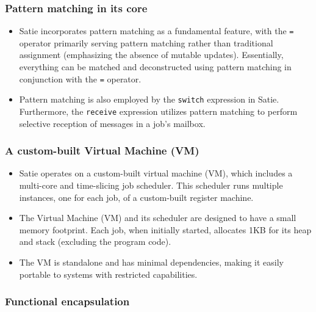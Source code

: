 \hypertarget{pattern-matching-in-its-core}{%
\subsubsection{Pattern matching in its
core}\label{pattern-matching-in-its-core}}

\begin{itemize}
\item
  Satie incorporates pattern matching as a fundamental feature, with the
  \texttt{=} operator primarily serving pattern matching rather than
  traditional assignment (emphasizing the absence of mutable updates).
  Essentially, everything can be matched and deconstructed using pattern
  matching in conjunction with the \texttt{=} operator.
\item
  Pattern matching is also employed by the \texttt{switch} expression in
  Satie. Furthermore, the \texttt{receive} expression utilizes pattern
  matching to perform selective reception of messages in a job's
  mailbox.
\end{itemize}

\hypertarget{a-custom-built-virtual-machine-vm}{%
\subsubsection{A custom-built Virtual Machine
(VM)}\label{a-custom-built-virtual-machine-vm}}

\begin{itemize}
\item
  Satie operates on a custom-built virtual machine (VM), which includes
  a multi-core and time-slicing job scheduler. This scheduler runs
  multiple instances, one for each job, of a custom-built register
  machine.
\item
  The Virtual Machine (VM) and its scheduler are designed to have a
  small memory footprint. Each job, when initially started, allocates
  1KB for its heap and stack (excluding the program code).
\item
  The VM is standalone and has minimal dependencies, making it easily
  portable to systems with restricted capabilities.
\end{itemize}

\hypertarget{functional-encapsulation}{%
\subsubsection{Functional
encapsulation}\label{functional-encapsulation}}

